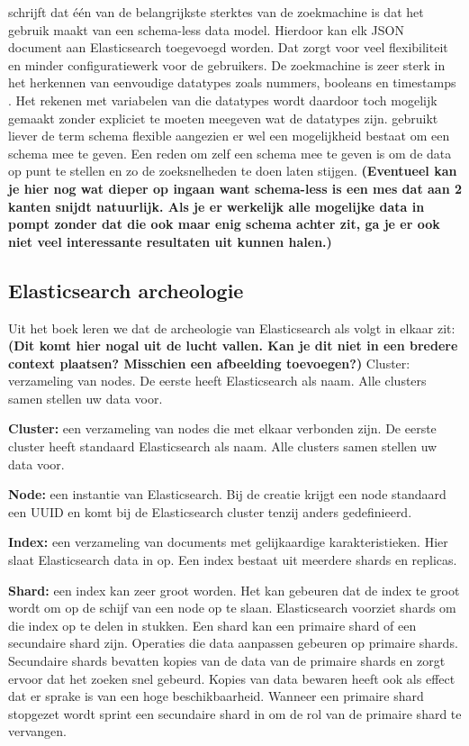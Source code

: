 \textcite{Gausser2012} schrijft dat één van de belangrijkste sterktes van de zoekmachine is dat het gebruik maakt van een schema-less data model. Hierdoor kan elk JSON document aan Elasticsearch toegevoegd worden. Dat zorgt voor veel flexibiliteit en minder configuratiewerk voor de gebruikers. De zoekmachine is zeer sterk in het herkennen van eenvoudige datatypes zoals nummers, booleans en timestamps \autocite{Brasetvik2013s}. Het rekenen met variabelen van die datatypes wordt daardoor toch mogelijk gemaakt zonder expliciet te moeten meegeven wat de datatypes zijn. \textcite{Brasetvik2013s} gebruikt liever de term schema flexible aangezien er wel een mogelijkheid bestaat om een schema mee te geven. Een reden om zelf een schema mee te geven is om de data op punt te stellen en zo de zoeksnelheden te doen laten stijgen. \textbf{(Eventueel kan je hier nog wat dieper op ingaan want schema-less is een mes dat aan 2 kanten snijdt natuurlijk. Als je er werkelijk alle mogelijke data in pompt zonder dat die ook maar enig schema achter zit, ga je er ook niet veel interessante resultaten uit kunnen halen.)
}
\subsection{Elasticsearch archeologie}

Uit het boek \textcite{Dixit2016} leren we dat de archeologie van Elasticsearch als volgt in elkaar zit:
\textbf{(Dit komt hier nogal uit de lucht vallen. Kan je dit niet in een bredere context plaatsen? Misschien een afbeelding toevoegen?)}
Cluster: verzameling van nodes. De eerste heeft Elasticsearch als naam. Alle clusters samen stellen uw data voor. 

\textbf{Cluster:} een verzameling van nodes die met elkaar verbonden zijn. De eerste cluster heeft standaard Elasticsearch als naam. Alle clusters samen stellen uw data voor. 

\textbf{Node:} een instantie van Elasticsearch. Bij de creatie krijgt een node standaard een UUID en komt bij de Elasticsearch cluster tenzij anders gedefinieerd.

\textbf{Index:} een verzameling van documents met gelijkaardige karakteristieken. Hier slaat Elasticsearch data in op. Een index bestaat uit meerdere shards en replicas. 

\textbf{Shard:} een index kan zeer groot worden. Het kan gebeuren dat de index te groot wordt om op de schijf van een node op te slaan. Elasticsearch voorziet shards om die index op te delen in stukken. Een shard kan een primaire shard of een secundaire shard zijn. Operaties die data aanpassen gebeuren op primaire shards. Secundaire shards bevatten kopies van de data van de primaire shards en zorgt ervoor dat het zoeken snel gebeurd. Kopies van data bewaren heeft ook als effect dat er sprake is van een hoge beschikbaarheid. Wanneer een primaire shard stopgezet wordt sprint een secundaire shard in om de rol van de primaire shard te vervangen.


